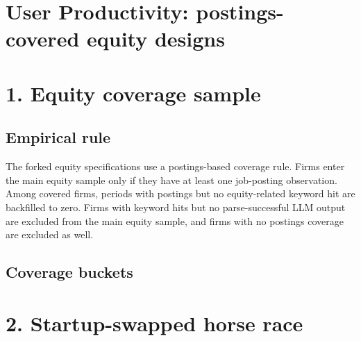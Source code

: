 \documentclass{article}
\newcommand{\cleanedresultsdir}{../../results/cleaned/tex}
\newcommand{\TableInput}[1]{}
\newcommand{\FloatNote}[1]{%
  \begingroup
    \captionsetup{style=noteflush}%
    \caption*{\textit{Notes:}~#1}%
  \endgroup
}
\begin{document}
\section*{User Productivity: postings-covered equity designs}

\section*{1. Equity coverage sample}

\subsection*{Empirical rule}
\noindent The forked equity specifications use a postings-based coverage rule. Firms enter the main equity sample only if they have at least one job-posting observation. Among covered firms, periods with postings but no equity-related keyword hit are backfilled to zero. Firms with keyword hits but no parse-successful LLM output are excluded from the main equity sample, and firms with no postings coverage are excluded as well.

\subsection*{Coverage buckets}
\begin{table}[H]
  \centering
  \caption{Equity coverage buckets in the worker sample}
  \TableInput{\cleanedresultsdir/llm_equity_postings_coverage_summary.tex}
  \FloatNote{The table is built by merging the precovid user panel to the enriched job-posting equity panel on normalized firm name and half-year keys. The first two rows are included in the main equity specifications. The third row is excluded because the keyword screen fired but no parse-successful LLM output is available. The final row is excluded because there is no postings coverage.}
\end{table}

\section*{2. Startup-swapped horse race}
\end{document}
